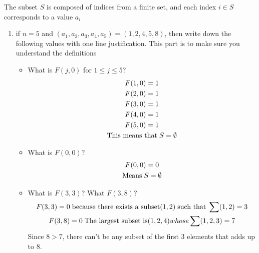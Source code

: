 \documentclass[11pt]{article}
\begin{document}
The subset $S$ is composed of indices from a finite set, and each index $i \in S$ corresponds to a value $a_i$

\begin{enumerate}
    \item if $n=5$ and $(a_{1}, a_{2},  a_{3}, a_{4}, a_{5}) = (1, 2, 4, 5, 8)$, then write down the following values with one line justification. This part is to make sure you understand the definitions
    \begin{itemize}
        \item What is $F(j, 0)$ for $1 \leq j \leq 5$?
        \begin{gather}
            F(1, 0) = 1 \\ F(2, 0) = 1 \\ F(3, 0) = 1 \\ F(4, 0) = 1 \\ F(5, 0) = 1 \\
            \text{This means that} \hspace{1.0mm}  S = \emptyset
        \end{gather}


        \item What is $F(0,0)$?
            \begin{gather}
                F(0,0) = 0 \\ \text{Means} \hspace{1.0mm} S = \emptyset
            \end{gather}
        \item What is $F(3, 3)$? What $F(3, 8)$?
        \begin{gather}
            F(3, 3) = 0 \hspace{1.0mm} \text{because there exists a  subset} (1, 2) \hspace{1.0mm} \text{such that} \hspace{1.0mm} \sum (1, 2) = 3 \\
            F(3, 8) = 0 \hspace{1.0mm} \text{The largest subset is} (1, 2, 4) whose \sum (1, 2, 3) = 7
        \end{gather}
        Since $8 > 7$, there can't be any subset of the first 3 elements that adds up to 8.
    \end{itemize}
\end{enumerate}
\end{document}

